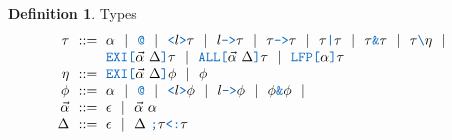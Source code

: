 \documentclass[acmsmall]{acmart}
\theoremstyle{definition}
\newtheorem{definition}{Definition}[section]
\begin{document}
\begin{definition} Types 
  \label{definition:types}
  \[\begin{array}[t]{r@{}l}
    \nonterm{\tau} & \is 
    \begin{array}[t]{@{}l}
      \alpha \sep
      \obj{@} \sep
      \obj{<}l\obj{>}\tau \sep 
      l\obj{->}\tau \sep 
      \tau\obj{->}\tau \sep 
      \tau\obj{|}\tau \sep 
      \tau\obj{\&}\tau \sep 
      \tau\obj{\textbackslash}\eta \sep 
      \\
      \obj{EXI[}\vec{\alpha}\ \Delta \obj{]} \tau \sep 
      \obj{ALL[}\vec{\alpha}\ \Delta \obj{]} \tau \sep 
      \obj{LFP[}\alpha\obj{]}\tau
    \end{array}
    \\
    \nonterm{\eta} & \is 
    \begin{array}[t]{@{}l}
      \obj{EXI[}\vec{\alpha}\ \Delta \obj{]} \phi \sep 
      \phi
    \end{array}
    \\
    \nonterm{\phi} & \is 
    \begin{array}[t]{@{}l}
      \alpha \sep
      \obj{@} \sep
      \obj{<}l\obj{>}\phi \sep 
      l\obj{->}\phi \sep 
      \phi\obj{\&}\phi \sep 
    \end{array}
    \\
    \nonterm{\vec{\alpha}} & \is \epsilon \sep \vec{\alpha}\ \alpha 
    \\
    \nonterm{\Delta} & \is \epsilon \sep \Delta\ \obj{;} \tau \obj{<:} \tau
  \end{array}\]
\end{definition}
\end{document}
